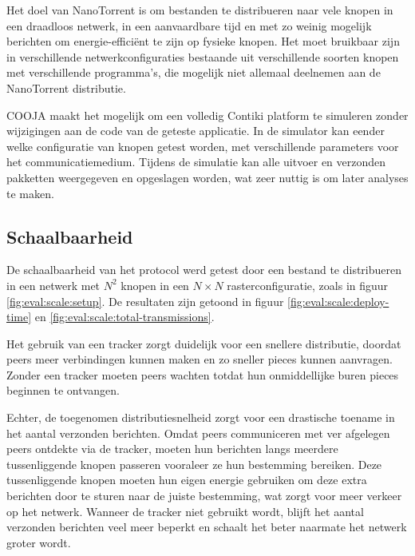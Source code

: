 \documentclass[journal]{IEEEtran}
\begin{document}
Het doel van NanoTorrent is om bestanden te distribueren naar vele knopen in een draadloos netwerk, in een aanvaardbare tijd en met zo weinig mogelijk berichten om energie-effici\"ent te zijn op fysieke knopen. Het moet bruikbaar zijn in verschillende netwerkconfiguraties bestaande uit verschillende soorten knopen met verschillende programma's, die mogelijk niet allemaal deelnemen aan de NanoTorrent distributie.

COOJA \cite{cooja} maakt het mogelijk om een volledig Contiki platform te simuleren zonder wijzigingen aan de code van de geteste applicatie. In de simulator kan eender welke configuratie van knopen getest worden, met verschillende parameters voor het communicatiemedium. Tijdens de simulatie kan alle uitvoer en verzonden pakketten weergegeven en opgeslagen worden, wat zeer nuttig is om later analyses te maken.

\subsection{Schaalbaarheid}
De schaalbaarheid van het protocol werd getest door een bestand te distribueren in een netwerk met $N^2$ knopen in een $N \times N$ rasterconfiguratie, zoals in figuur \ref{fig:eval:scale:setup}. De resultaten zijn getoond in figuur \ref{fig:eval:scale:deploy-time} en \ref{fig:eval:scale:total-transmissions}.

Het gebruik van een tracker zorgt duidelijk voor een snellere distributie, doordat peers meer verbindingen kunnen maken en zo sneller pieces kunnen aanvragen. Zonder een tracker moeten peers wachten totdat hun onmiddellijke buren pieces beginnen te ontvangen.

Echter, de toegenomen distributiesnelheid zorgt voor een drastische toename in het aantal verzonden berichten. Omdat peers communiceren met ver afgelegen peers ontdekte via de tracker, moeten hun berichten langs meerdere tussenliggende knopen passeren vooraleer ze hun bestemming bereiken. Deze tussenliggende knopen moeten hun eigen energie gebruiken om deze extra berichten door te sturen naar de juiste bestemming, wat zorgt voor meer verkeer op het netwerk. Wanneer de tracker niet gebruikt wordt, blijft het aantal verzonden berichten veel meer beperkt en schaalt het beter naarmate het netwerk groter wordt.
\end{document}
